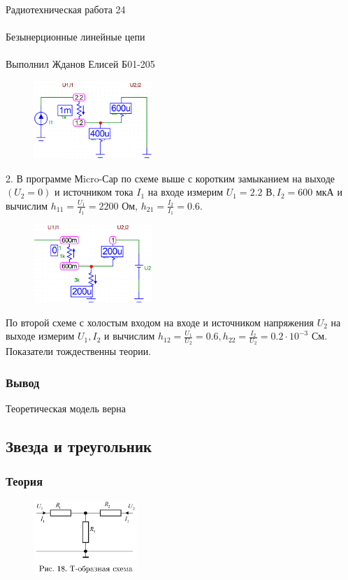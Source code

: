 \documentclass{astroedu-lab}
\begin{document}
\begin{problem}{\huge Радиотехническая работа 24\\\\Безынерционные линейные цепи\\\\Выполнил Жданов Елисей Б01-205}
\begin{figure}[!h]
	\centering
	\includegraphics[width=0.4\textwidth]{18a.png}
	\label{fig:boiler}
\end{figure}

2. В программе Мicro-Сар по схеме выше с коротким замыканием на выходе $\left(U_2=0\right)$ и источником тока $I_1$ на входе измерим $U_1 = 2.2$ В$, I_2 = 600$ мкА и вычислим $h_{11}=\frac{U_1}{I_1} = 2200 $ Ом, $h_{21}=\frac{I_2}{I_1} = 0.6$.

\begin{figure}[!h]
	\centering
	\includegraphics[width=0.4\textwidth]{18b.png}
	\label{fig:boiler}
\end{figure}

По второй схеме с холостым входом на входе и источником напряжения $U_2$ на выходе измерим $U_1, I_2$ и вычислим $h_{12}=\frac{U_1}{U_2} = 0.6, h_{22}=\frac{I_2}{U_2} = 0.2 \cdot 10^{-3}$ См. Показатели тождественны теории.

\subsubsection{Вывод}

Теоретическая модель верна

\subsection{Звезда и треугольник}

\subsubsection{Теория}

\begin{figure}[!h]
	\centering
	\includegraphics[width=0.35\textwidth]{18.png}
	\label{fig:boiler}
\end{figure}


\end{problem}
\end{document}

